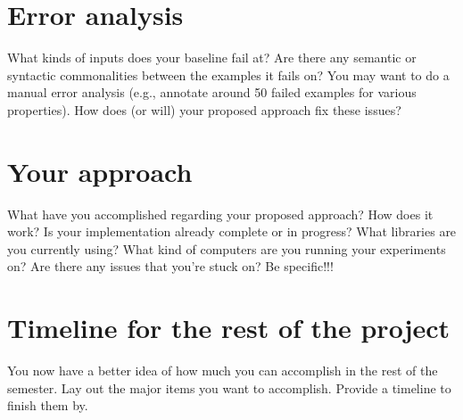 \documentclass[11pt,a4paper]{article}
\begin{document}
    \section{Error analysis}
    What kinds of inputs does your baseline fail at? Are there any semantic or syntactic commonalities between the examples it fails on? You may want to do a manual error analysis (e.g., annotate around 50 failed examples for various properties). How does (or will) your proposed approach fix these issues?
    
    \section{Your approach}
    What have you accomplished regarding your proposed approach? How does it work? Is your implementation already complete or in progress? What libraries are you currently using? What kind of computers are you running your experiments on? Are there any issues that you're stuck on? Be specific!!!
    
    \section{Timeline for the rest of the project}
    You now have a better idea of how much you can accomplish in the rest of the semester. Lay out the major items you want to accomplish. Provide a timeline to finish them by.
    
    
    
    \footnotesize
    
    
    
    
\end{document}
